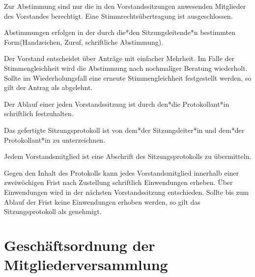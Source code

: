 \begin{gfvorstand}
  Zur Abstimmung sind nur die in den Vorstandssitzungen anwesenden Mitglieder des Vorstandes berechtigt. Eine Stimmrechtsübertragung ist ausgeschlossen.

  Abstimmungen erfolgen in der durch die*den Sitzungsleitende*n bestimmten Form(Handzeichen, Zuruf, schriftliche Abstimmung).

  Der Vorstand entscheidet über Anträge mit einfacher Mehrheit. Im Falle der Stimmengleichheit wird die Abstimmung nach nochmaliger Beratung wiederholt. Sollte im Wiederholungsfall eine erneute Stimmengleichheit festgestellt werden, so gilt der Antrag als abgelehnt.


  Der Ablauf einer jeden Vorstandssitzung ist durch den*die Protokollant*in schriftlich festzuhalten.

  Das gefertigte Sitzungsprotokoll ist von dem*der Sitzungsleiter*in und dem*der Protokollant*in zu unterzeichnen.

  Jedem Vorstandsmitglied ist eine Abschrift des Sitzungsprotokolls zu übermitteln.

  Gegen den Inhalt des Protokolls kann jedes Vorstandsmitglied innerhalb einer zweiwöchigen Frist nach Zustellung schriftlich Einwendungen erheben. Über Einwendungen wird in der nächsten Vorstandssitzung entschieden. Sollte bis zum Ablauf der Frist keine Einwendungen erhoben werden, so gilt das Sitzungsprotokoll als genehmigt.

\end{gfvorstand}

\section{Geschäftsordnung der Mitgliederversammlung}

